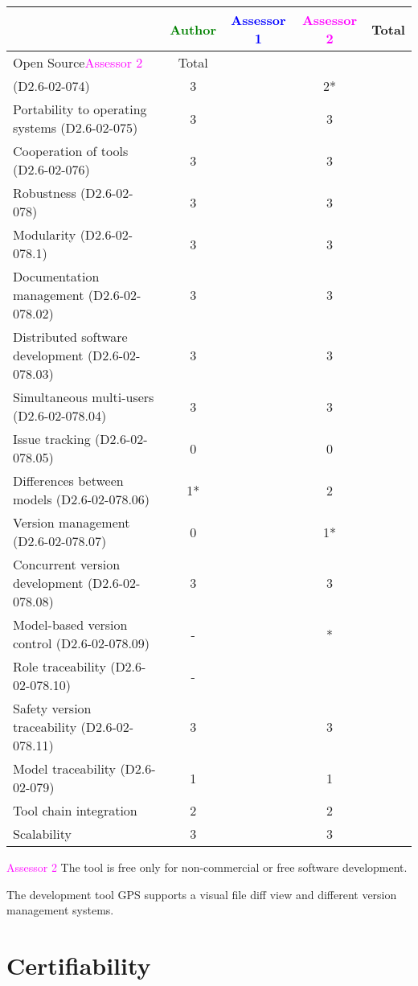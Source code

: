 \begin{tabular}{|l | c | c | c | c|}
\hline
& \textcolor{green}{Author} & \textcolor{blue}{Assessor 1} & \textcolor{magenta}{Assessor 2} & Total \\
\hline 
Open Source\textcolor{magenta}{Assessor 2} & Total \\ (D2.6-02-074) & 3 & & 2*&  \\
\hline 
Portability to operating systems (D2.6-02-075) & 3 & & 3 &  \\
\hline
Cooperation of tools (D2.6-02-076) & 3 & & 3 &  \\
\hline
Robustness (D2.6-02-078) & 3 & & 3 & \\
\hline
Modularity (D2.6-02-078.1) & 3 & & 3 & \\
\hline
Documentation management (D2.6-02-078.02) & 3 & & 3 & \\
\hline
Distributed software development (D2.6-02-078.03)  & 3 & & 3 & \\
\hline
Simultaneous multi-users (D2.6-02-078.04)   & 3 & & 3 & \\
\hline
Issue tracking (D2.6-02-078.05) & 0 & & 0 & \\
\hline
Differences between models (D2.6-02-078.06) & 1* & & 2 & \\
\hline
Version management (D2.6-02-078.07) & 0 & & 1* & \\
\hline
Concurrent version development (D2.6-02-078.08) & 3 & & 3 & \\
\hline
Model-based version control (D2.6-02-078.09) & - & & * & \\
\hline
Role traceability (D2.6-02-078.10) & - & & & \\
\hline
Safety version traceability (D2.6-02-078.11) & 3 & & 3 & \\
\hline
Model traceability (D2.6-02-079) & 1 & & 1 & \\
\hline
Tool chain integration & 2 & & 2 & \\
\hline
Scalability & 3 & & 3 & \\
\hline
\end{tabular}

\textcolor{magenta}{Assessor 2} The tool is free only for non-commercial or free
software development.

The development tool GPS supports a visual file diff view and different version
management systems.

\section{Certifiability}


